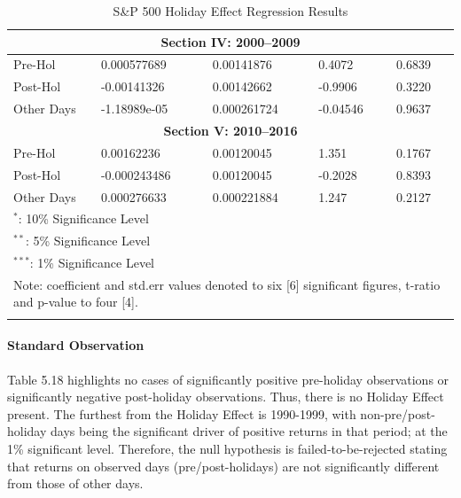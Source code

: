 \documentclass[11pt, english]{article}
\begin{document}
\begin{center}
\begin{longtable}{p{2cm}p{2cm}p{2cm}p{2cm}p{2cm}}
                \multicolumn{5}{c}{\textbf{Section IV: 2000--2009}}\\
                \hline                                          
                Pre-Hol & 0.000577689 & 0.00141876 & 0.4072 & 0.6839\\
                Post-Hol & -0.00141326 & 0.00142662 & -0.9906 & 0.3220\\  
                Other Days & -1.18989e-05 & 0.000261724 & -0.04546 & 0.9637\\
                \hline 
                \multicolumn{5}{c}{\textbf{Section V: 2010--2016}}\\   
                \hline            
                Pre-Hol & 0.00162236 & 0.00120045 & 1.351 & 0.1767\\ 
                Post-Hol & -0.000243486 & 0.00120045 & -0.2028 & 0.8393\\  
                Other Days & 0.000276633 & 0.000221884 & 1.247 & 0.2127\\
                \hline
                \multicolumn{5}{l}{$^*$: 10\% Significance Level}\\  
                \multicolumn{5}{l}{$^{**}$: 5\% Significance Level}\\ 
                \multicolumn{5}{l}{$^{***}$: 1\% Significance Level}\\
                \hline
		\multicolumn{5}{p{11.5cm}}{Note: coefficient and std.err values denoted to six [6] significant figures, t-ratio and p-value to four [4].}\\
                \hline
		\caption{S\&P 500 Holiday Effect Regression Results}
        \end{longtable}
        \end{center}

			\paragraph{Standard Observation}

			Table 5.18 highlights no cases of significantly positive pre-holiday observations or significantly negative post-holiday observations. Thus, there is no Holiday Effect present. The furthest from the Holiday Effect is 1990-1999, with non-pre/post-holiday days being the significant driver of positive returns in that period; at the 1\% significant level. Therefore, the null hypothesis is failed-to-be-rejected stating that returns on observed days (pre/post-holidays) are not significantly different from those of other days.
\end{document}
